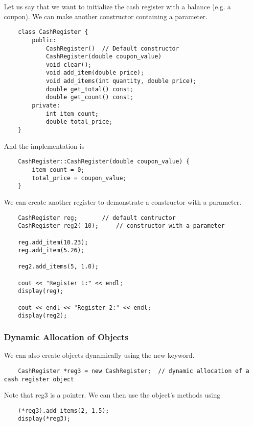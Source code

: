 \documentclass[]{article}
\begin{document}
Let us say that we want to initialize the cash register with a balance (e.g. a coupon). We can make another constructor containing a parameter. \\

\begin{lstlisting}
	class CashRegister {
		public:
			CashRegister() 	// Default constructor
			CashRegister(double coupon_value)
			void clear();
			void add_item(double price);
			void add_items(int quantity, double price);
			double get_total() const;
			double get_count() const;
		private:
			int item_count;
			double total_price;
	}
\end{lstlisting}\bigbreak

And the implementation is

\begin{lstlisting}
	CashRegister::CashRegister(double coupon_value) {
		item_count = 0;
		total_price = coupon_value;
	}
\end{lstlisting}\bigbreak

We can create another register to demonstrate a constructor with a parameter.

\begin{lstlisting}
	CashRegister reg;		// default contructor
	CashRegister reg2(-10);		// constructor with a parameter
	
	reg.add_item(10.23);
	reg.add_item(5.26);
	
	reg2.add_items(5, 1.0);
	
	cout << "Register 1:" << endl;
	display(reg);
	
	cout << endl << "Register 2:" << endl;
	display(reg2); 
\end{lstlisting}\bigbreak


\subsubsection{Dynamic Allocation of Objects}
\bigbreak

We can also create objects dynamically using the new keyword.

\begin{lstlisting}
	CashRegister *reg3 = new CashRegister;	// dynamic allocation of a cash register object
\end{lstlisting}\bigbreak

Note that reg3 is a pointer. We can then use the object's methods using

\begin{lstlisting}
	(*reg3).add_items(2, 1.5);
	display(*reg3);
\end{lstlisting}\bigbreak
\end{document}
